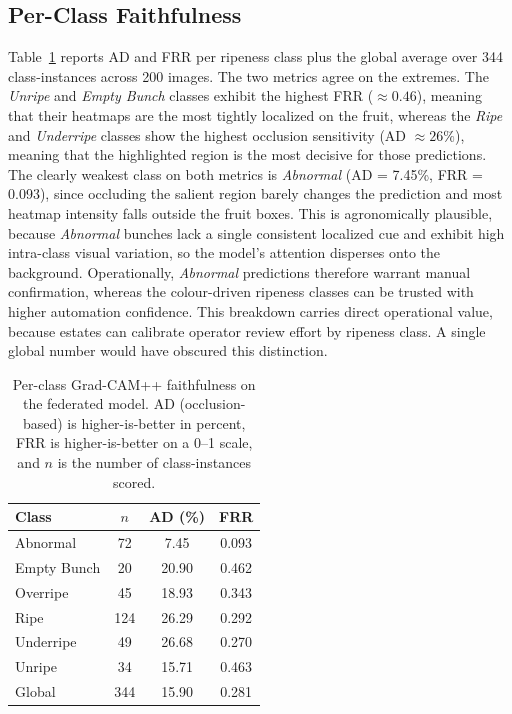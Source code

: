 \documentclass[conference, compsoc, twoside]{IEEEtran}
\begin{document}
\subsection{Per-Class Faithfulness}
Table~\ref{tab:xai} reports AD and FRR per ripeness class plus the global average over 344 class-instances across 200 images. The two metrics agree on the extremes. The \textit{Unripe} and \textit{Empty Bunch} classes exhibit the highest FRR ($\approx 0.46$), meaning that their heatmaps are the most tightly localized on the fruit, whereas the \textit{Ripe} and \textit{Underripe} classes show the highest occlusion sensitivity (AD $\approx 26\%$), meaning that the highlighted region is the most decisive for those predictions. The clearly weakest class on both metrics is \textit{Abnormal} (AD = 7.45\%, FRR = 0.093), since occluding the salient region barely changes the prediction and most heatmap intensity falls outside the fruit boxes. This is agronomically plausible, because \textit{Abnormal} bunches lack a single consistent localized cue and exhibit high intra-class visual variation, so the model's attention disperses onto the background. Operationally, \textit{Abnormal} predictions therefore warrant manual confirmation, whereas the colour-driven ripeness classes can be trusted with higher automation confidence. This breakdown carries direct operational value, because estates can calibrate operator review effort by ripeness class. A single global number would have obscured this distinction.

\begin{table}[!htbp]
\centering
\caption{Per-class Grad-CAM++ faithfulness on the federated model. AD (occlusion-based) is higher-is-better in percent, FRR is higher-is-better on a 0--1 scale, and $n$ is the number of class-instances scored.}
\label{tab:xai}
\small
\begin{tabular}{lccc}
\hline
Class       & $n$ & AD (\%) & FRR   \\
\hline
Abnormal    & 72  & 7.45    & 0.093 \\
Empty Bunch & 20  & 20.90   & 0.462 \\
Overripe    & 45  & 18.93   & 0.343 \\
Ripe        & 124 & 26.29   & 0.292 \\
Underripe   & 49  & 26.68   & 0.270 \\
Unripe      & 34  & 15.71   & 0.463 \\
\hline
Global      & 344 & 15.90   & 0.281 \\
\hline
\end{tabular}
\end{table}
\end{document}
